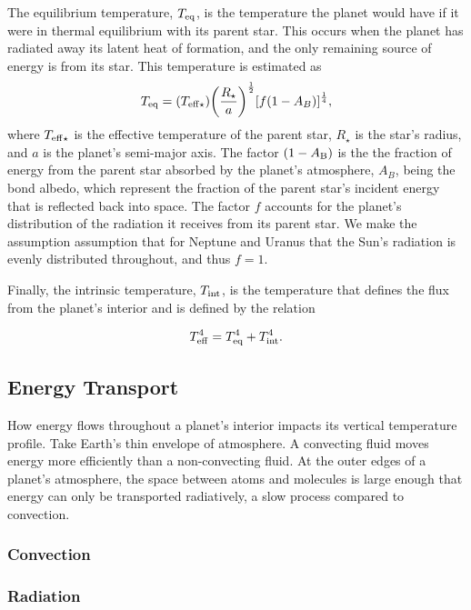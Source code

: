 \documentclass[11pt]{ucscthesisbs}
\begin{document}
The equilibrium temperature, $T_{\rm eq}$, is the temperature the planet would have if it were in thermal equilibrium with its parent star. This occurs when the planet has radiated away its latent heat of formation, and the only remaining source of energy is from its star. This temperature is estimated as
\begin{equation}
    T_{\rm eq} = (T_{\rm eff\star})\bigg(\frac{R_{\star}}{a}\bigg)^{\frac{1}{2}}[f(1-A_{B})]^{\frac{1}{4}},
  \label{eq:equilibrium_temp}
\end{equation} 
where $T_{\rm eff\star}$ is the effective temperature of the parent star, $R_{\star}$ is the star's radius, and $a$ is the planet's semi-major axis. The factor $(1 - A_{\rm B})$ is the the fraction of energy from the parent star absorbed by the planet's atmosphere, $A_{B}$, being the bond albedo, which represent the fraction of the parent star's incident energy that is reflected back into space. The factor $f$ accounts for the planet's distribution of the radiation it receives from its parent star. We make the assumption assumption that for Neptune and Uranus that the Sun's radiation is evenly distributed throughout, and thus $f = 1$. 

Finally, the intrinsic temperature, $T_{\rm int}$, is the temperature that defines the flux from the planet's interior and is defined by the relation

\begin{equation}
    T_{\rm eff}^4 =  T_{\rm eq}^4 +  T_{\rm int}^4.
  \label{eq:effective_temp}
\end{equation} 

\subsection{Energy Transport}
How energy flows throughout a planet's interior impacts its vertical temperature profile. Take Earth's thin envelope of atmosphere. A convecting fluid moves energy more efficiently than a non-convecting fluid. At the outer edges of a planet's atmosphere, the space between atoms and molecules is large enough that energy can only be transported radiatively, a slow process compared to convection.

\subsubsection{Convection}
\subsubsection{Radiation}
\end{document}

